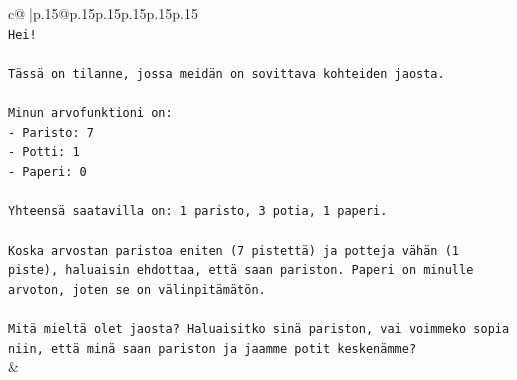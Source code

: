\documentclass{article}
\begin{document}
{\begin{supertabular}{c@{$\;$}|p{.15\linewidth}@{}p{.15\linewidth}p{.15\linewidth}p{.15\linewidth}p{.15\linewidth}p{.15\linewidth}}
{{{\\ 
\texttt{Hei!} \\
\\ 
\texttt{Tässä on tilanne, jossa meidän on sovittava kohteiden jaosta.} \\
\\ 
\texttt{Minun arvofunktioni on:} \\
\texttt{{-} Paristo: 7} \\
\texttt{{-} Potti: 1} \\
\texttt{{-} Paperi: 0} \\
\\ 
\texttt{Yhteensä saatavilla on: 1 paristo, 3 potia, 1 paperi.} \\
\\ 
\texttt{Koska arvostan paristoa eniten (7 pistettä) ja potteja vähän (1 piste), haluaisin ehdottaa, että saan pariston. Paperi on minulle arvoton, joten se on välinpitämätön.} \\
\\ 
\texttt{Mitä mieltä olet jaosta? Haluaisitko sinä pariston, vai voimmeko sopia niin, että minä saan pariston ja jaamme potit keskenämme?} \\
            }
        }
    }
    & \\ \\


\end{supertabular}}
\end{document}
